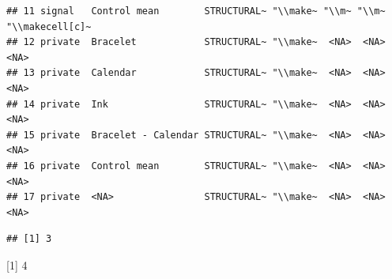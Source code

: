 \documentclass[
]{article}
\begin{document}
\begin{verbatim}
## 11 signal   Control mean        STRUCTURAL~ "\\make~ "\\m~ "\\m~ "\\makecell[c]~
## 12 private  Bracelet            STRUCTURAL~ "\\make~  <NA>  <NA>  <NA>          
## 13 private  Calendar            STRUCTURAL~ "\\make~  <NA>  <NA>  <NA>          
## 14 private  Ink                 STRUCTURAL~ "\\make~  <NA>  <NA>  <NA>          
## 15 private  Bracelet - Calendar STRUCTURAL~ "\\make~  <NA>  <NA>  <NA>          
## 16 private  Control mean        STRUCTURAL~ "\\make~  <NA>  <NA>  <NA>          
## 17 private  <NA>                STRUCTURAL~ "\\make~  <NA>  <NA>  <NA>
\end{verbatim}

\begin{verbatim}
## [1] 3
\end{verbatim}

{[}1{]} 4
\end{document}
